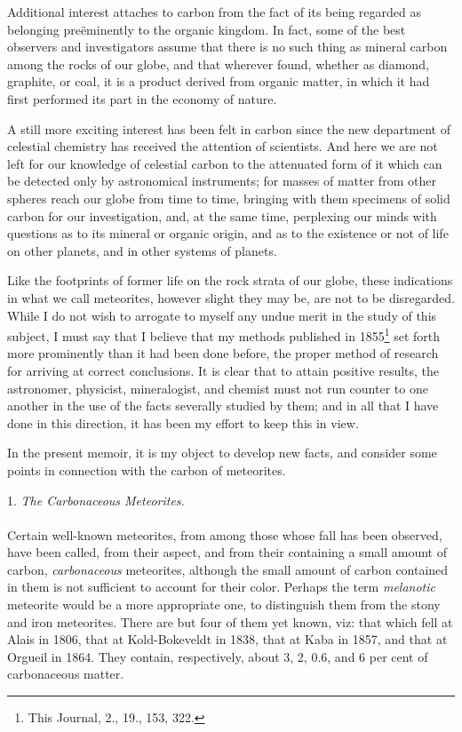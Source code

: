 \documentclass[a4paper, 11pt, oneside, english]{article}
\begin{document}
Additional interest attaches to carbon from the fact of its being regarded as belonging preëminently to the organic kingdom. In fact, some of the best observers and investigators assume that there is no such thing as mineral carbon among the rocks of our globe, and that wherever found, whether as diamond, graphite, or coal, it is a product derived from organic matter, in which it had first performed its part in the economy of nature.

A still more exciting interest has been felt in carbon since the new department of celestial chemistry has received the attention of scientists. And here we are not left for our knowledge of celestial carbon to the attenuated form of it which can be detected only by astronomical instruments; for masses of matter from other spheres reach our globe from time to time, bringing with them specimens of solid carbon for our investigation, and, at the same time, perplexing our minds with questions as to its mineral or organic origin, and as to the existence or not of life on other planets, and in other systems of planets.

Like the footprints of former life on the rock strata of our globe, these indications in what we call meteorites, however slight they may be, are not to be disregarded. While I do not wish to arrogate to myself any undue merit in the study of this subject, I must say that I believe that my methods published in 1855\footnote{This Journal, 2., 19., 153, 322.} set forth more prominently than it had been done before, the proper method of research for arriving at correct conclusions. It is clear that to attain positive results, the astronomer, physicist, mineralogist, and chemist must not run counter to one another in the use of the facts severally studied by them; and in all that I have done in this direction, it has been my effort to keep this in view.

In the present memoir, it is my object to develop new facts, and consider some points in connection with the carbon of meteorites.
\begin{center}
1. \emph{The Carbonaceous Meteorites.}
\end{center}
\paragraph{}
Certain well-known meteorites, from among those whose fall has been observed, have been called, from their aspect, and from their containing a small amount of carbon, \emph{carbonaceous} meteorites, although the small amount of carbon contained in them is not sufficient to account for their color. Perhaps the term \emph{melanotic} meteorite would be a more appropriate one, to distinguish them from the stony and iron meteorites. There are but four of them yet known, viz: that which fell at Alais in 1806, that at Kold-Bokeveldt in 1838, that at Kaba in 1857, and that at Orgueil in 1864. They contain, respectively, about 3, 2, 0.6, and 6 per cent of carbonaceous matter.
\end{document}
